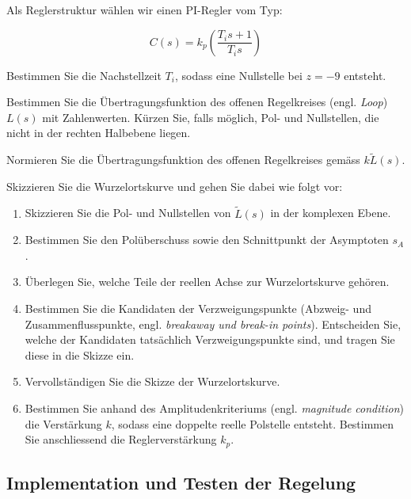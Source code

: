 \documentclass[a4paper,11pt]{scrartcl}
\begin{document}
Als Reglerstruktur wählen wir einen PI-Regler vom Typ:

\[
    C(s) = k_p \left( \frac{T_i s + 1}{T_i s} \right)
\]

\begin{aufgaben}
    \item Bestimmen Sie die Nachstellzeit $T_i$, sodass eine Nullstelle bei $z = -9$ entsteht.
    \item Bestimmen Sie die Übertragungsfunktion des offenen Regelkreises (engl. \emph{Loop}) $L(s)$ mit Zahlenwerten. Kürzen Sie, falls möglich, Pol- und Nullstellen, die nicht in der rechten Halbebene liegen.
    \item Normieren Sie die Übertragungsfunktion des offenen Regelkreises gemäss $k\tilde{L}(s)$.
    \item Skizzieren Sie die Wurzelortskurve und gehen Sie dabei wie folgt vor:
    \begin{enumerate}[label*=\alph*), leftmargin=2em]
        \item Skizzieren Sie die Pol- und Nullstellen von $\tilde{L}(s)$ in der komplexen Ebene.
        \item Bestimmen Sie den Polüberschuss sowie den Schnittpunkt der Asymptoten $s_A$.
        \item Überlegen Sie, welche Teile der reellen Achse zur Wurzelortskurve gehören.
        \item Bestimmen Sie die Kandidaten der Verzweigungspunkte (Abzweig- und Zusammenflusspunkte, engl. \emph{breakaway und break-in points}). Entscheiden Sie, welche der Kandidaten tatsächlich Verzweigungspunkte sind, und tragen Sie diese in die Skizze ein.
        \item Vervollständigen Sie die Skizze der Wurzelortskurve.
        \item Bestimmen Sie anhand des Amplitudenkriteriums (engl. \emph{magnitude condition}) die Verstärkung $k$, sodass eine doppelte reelle Polstelle entsteht. Bestimmen Sie anschliessend die Reglerverstärkung $k_p$.
    \end{enumerate}
\end{aufgaben}

\newpage
\begin{answerboxfillpage}\end{answerboxfillpage}

\newpage
\subsection*{Implementation und Testen der Regelung}
\end{document}
